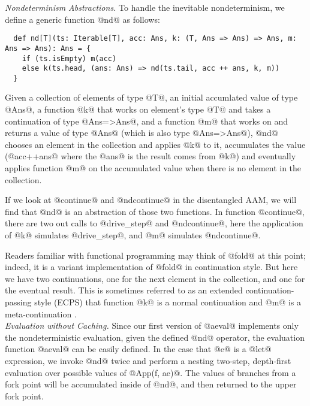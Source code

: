 \documentclass[acmsmall, review]{acmart}\settopmatter{}
\begin{document}
\textit{Nondeterminism Abstractions.}
To handle the inevitable nondeterminism, we define a generic function @nd@ as follows:

\begin{lstlisting}
  def nd[T](ts: Iterable[T], acc: Ans, k: (T, Ans => Ans) => Ans, m: Ans => Ans): Ans = {
    if (ts.isEmpty) m(acc)
    else k(ts.head, (ans: Ans) => nd(ts.tail, acc ++ ans, k, m))
  }
\end{lstlisting}

Given a collection of elements of type @T@, an initial accumlated value of type 
@Ans@, a function @k@ that works on element's type @T@ and takes a continuation 
of type @Ans=>Ans@, and a function @m@ that works on and returns a value of type 
@Ans@ (which is also type @Ans=>Ans@), @nd@ chooses an element in the collection 
and applies @k@ to it, accumulates the value (@acc++ans@ where the @ans@ is the 
result comes from @k@) and eventually applies function @m@ on the accumulated 
value when there is no element in the collection.

If we look at @continue@ and @ndcontinue@ in the disentangled AAM, we will find
that @nd@ is an abstraction of those two functions. In function @continue@,
there are two out calls to @drive_step@ and @ndcontinue@, here the application
of @k@ simulates @drive_step@, and @m@ simulates @ndcontinue@.

Readers familiar with functional programming may think of @fold@ at this point; indeed,
it is a variant implementation of @fold@ in continuation style. But here we have two
continuations, one for the next element in the collection, and one for the eventual result.
This is sometimes referred to as an extended continuation-passing style (ECPS)
that function @k@ is a normal continuation and @m@ is a meta-continuation 
\cite{Danvy:1990:AC:91556.91622}. \\

\textit{Evaluation without Caching.}
Since our first version of @aeval@ implements only the nondeterministic evaluation, 
given the defined @nd@ operator, the evaluation function @aeval@ can be easily defined. 
In the case that @e@ is a @let@ expression, we invoke @nd@ twice and perform a nesting 
two-step, depth-first evaluation over possible values of @App(f, ae)@.
The values of branches from a fork point will be accumulated inside of @nd@, and 
then returned to the upper fork point.
\end{document}
